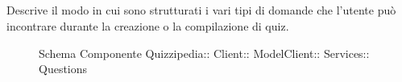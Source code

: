 \subsection{}
Descrive il modo in cui sono strutturati i vari tipi di domande che l'utente può incontrare durante la creazione o la compilazione di quiz.
\begin{figure}[H]
\centering
\noindent{}
\caption[Schema Componente Questions]{Schema Componente Quizzipedia:: Client:: ModelClient:: Services:: Questions}
\end{figure}
